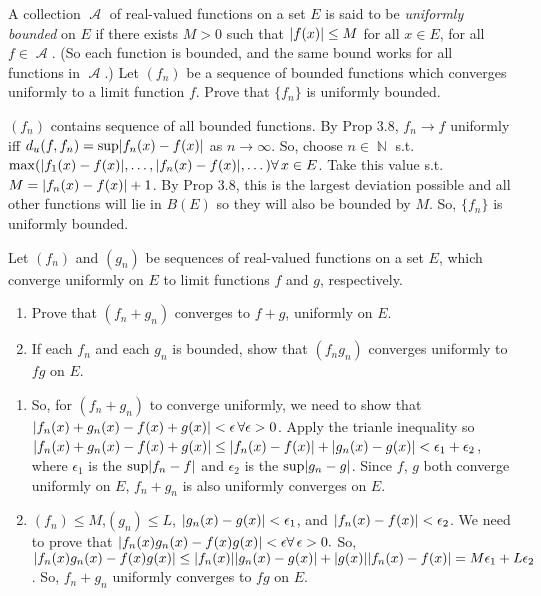 \documentclass[12pt,letterpaper,boxed]{hmcpset}
\DeclareMathOperator{\A}{\mathcal{A}}
\DeclareMathOperator{\N}{\mathbb{N}}
\DeclarePairedDelimiter\abs{\lvert}{\rvert}%
\begin{document}

\begin{problem}[Exercise 3.9]
A collection $\A$ of real-valued functions on a set $E$ is said to be \textit{uniformly bounded} on $E$ if there exists $M > 0$ such that $\abs{f(x)} \leq M$ for all $x \in E$, for all $f\in\A.$ (So each function is bounded, and the same bound works for all functions in $\A$.) Let $(f_n)$ be a sequence of bounded functions which converges uniformly to a limit function $f$. Prove that $\{f_n\}$ is uniformly bounded.
\end{problem}

\begin{solution}
$(f_n)$ contains sequence of all bounded functions. By Prop 3.8, $f_n \rightarrow f$ uniformly iff $d_u(f, f_n) = \sup \abs{f_n(x) - f(x)}$ as $n\rightarrow\infty$. So, choose $n\in\N$ s.t. $\max(\abs{f_1(x) - f(x)}, \dots, \abs{f_n(x) - f(x)}, \dots) \forall \, x \in E$. Take this value s.t. $M = \abs{f_n(x) - f(x)} + 1$. By Prop 3.8, this is the largest deviation possible and all other functions will lie in $B(E)$ so they will also be bounded by $M$. So, $\{f_n\}$ is uniformly bounded.
\end{solution}

\begin{problem}[Exercise 3.10]
Let $(f_n)$ and $(g_n)$ be sequences of real-valued functions on a set $E$, which converge uniformly on $E$ to limit functions $f$ and $g$, respectively.
\begin{enumerate}
    \item Prove that $(f_n + g_n)$ converges to $f + g$, uniformly on $E$.
    \item If each $f_n$ and each $g_n$ is bounded, show that $(f_n g_n)$ converges uniformly to $fg$ on $E$.
\end{enumerate} 
\end{problem}

\begin{solution}
\begin{enumerate}
    \item So, for $(f_n + g_n)$ to converge uniformly, we need to show that $\abs{f_n(x) + g_n(x) - f(x) + g(x)} < \epsilon\, \forall \epsilon > 0$. Apply the trianle inequality so $\abs{f_n(x) + g_n(x) - f(x) + g(x)} \leq \abs{f_n(x) - f(x)} + \abs{g_n(x) - g(x)} < \epsilon_1 + \epsilon_2$, where $\epsilon_1$ is the $\sup \abs{f_n - f}$ and $\epsilon_2$ is the $\sup \abs{g_n - g}$. Since $f$, $g$ both converge uniformly on $E$, $f_n + g_n$ is also uniformly converges on $E$.
    \item $(f_n) \leq M$,$(g_n) \leq L$, $\abs{g_n(x) - g(x)} < \epsilon_1$, and $\abs{f_n(x) - f(x)} < \epsilon_2$. We need to prove that $\abs{f_n(x)g_n(x) - f(x)g(x)} < \epsilon \forall \, \epsilon > 0.$ So, $\abs{f_n(x)g_n(x) - f(x)g(x)} \leq \abs{f_n(x)}\abs{g_n(x) - g(x)} + \abs{g(x)}\abs{f_n(x) - f(x)} = M\epsilon_1 + L\epsilon_2$. So, $f_n + g_n$ uniformly converges to $fg$ on $E$.
\end{enumerate}
\end{solution}
\end{document}
